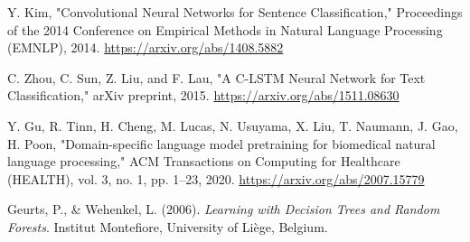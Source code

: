 \documentclass[12pt]{report}
\begin{document}
\begin{thebibliography}{99}
Y. Kim,
"Convolutional Neural Networks for Sentence Classification,"
Proceedings of the 2014 Conference on Empirical Methods in Natural Language Processing (EMNLP), 2014.
\url{https://arxiv.org/abs/1408.5882}

C. Zhou, C. Sun, Z. Liu, and F. Lau,
"A C-LSTM Neural Network for Text Classification,"
arXiv preprint, 2015.
\url{https://arxiv.org/abs/1511.08630}

Y. Gu, R. Tinn, H. Cheng, M. Lucas, N. Usuyama, X. Liu, T. Naumann, J. Gao, H. Poon, "Domain-specific language model pretraining for biomedical natural language processing," ACM Transactions on Computing for Healthcare (HEALTH), vol. 3, no. 1, pp. 1–23, 2020. \url{https://arxiv.org/abs/2007.15779}

Geurts, P., \& Wehenkel, L. (2006). \textit{Learning with Decision Trees and Random Forests}. Institut Montefiore, University of Liège, Belgium.





























\end{thebibliography}
\end{document}
